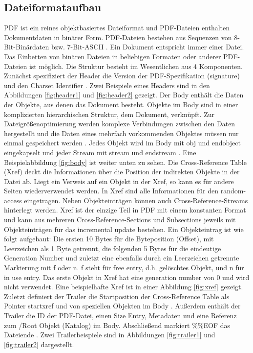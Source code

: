 \subsection{Dateiformataufbau}
PDF ist ein reines objektbasiertes Dateiformat und PDF-Dateien enthalten Dokumentdaten in binärer Form. PDF-Dateien bestehen aus Sequenzen von 8-Bit-Binärdaten bzw. 7-Bit-ASCII \cite{schneeberger}. Ein Dokument entspricht immer einer Datei. Das Einbetten von binären Dateien in beliebigen Formaten oder anderer PDF-Dateien ist möglich. Die Struktur besteht im Wesentlichen aus 4 Komponenten. Zunächst spezifiziert der Header die Version der PDF-Spezifikation (signature) und den Charset Identifier \cite{ccc-pdf-secrets}. Zwei Beispiele eines Headers sind in den Abbildungen \ref{fig:header1} und \ref{fig:header2} gezeigt. Der Body enthält die Daten der Objekte, aus denen das Dokument besteht. Objekte im Body sind in einer komplizierten hierarchischen Struktur, dem Dokument, verknüpft. Zur Dateigrößenoptimierung werden komplexe Verbindungen zwischen den Daten hergestellt und die Daten eines mehrfach vorkommenden Objektes müssen nur einmal gespeichert werden \cite{softx}. Jedes Objekt wird im Body mit obj und endobject eingekapselt und jeder Stream mit stream und endstream \cite{schneeberger}. Eine Beispielabbildung \ref{fig:body} ist weiter unten zu sehen. Die Cross-Reference Table (Xref) deckt die Informationen über die Position der indirekten Objekte in der Datei ab. Liegt ein Verweis auf ein Objekt in der Xref, so kann es für andere Seiten wiederverwendet werden. In Xref sind alle Informationen für den random-access eingetragen. Neben Objekteinträgen können auch Cross-Reference-Streams hinterlegt werden. Xref ist der einzige Teil in PDF mit einem konstanten Format und kann aus mehreren Cross-Reference-Sections und Subsections jeweils mit Objekteinträgen für das incremental update bestehen. Ein Objekteintrag ist wie folgt aufgebaut: Die ersten 10 Bytes für die Byteposition (Offset), mit Leerzeichen als 1 Byte getrennt, die folgenden 5 Bytes für die eindeutige Generation Number und zuletzt eine ebenfalls durch ein Leerzeichen getrennte Markierung mit f oder n. f steht für free entry, d.h. gelöschtes Objekt, und n für in use entry. Das erste Objekt in Xref hat eine generation number von 0 und wird nicht verwendet. Eine beispielhafte Xref ist in einer Abbildung \ref{fig:xref} gezeigt. Zuletzt definiert der Trailer die Startposition der Cross-Reference Table als Pointer startxref und von speziellen Objekten im Body \cite{ccc-break-pdf}.  Außerdem enthält der Trailer die ID der PDF-Datei, einen Size Entry, Metadaten und eine Referenz zum /Root Objekt (Katalog) im Body. Abschließend markiert \%\%EOF das Dateiende \cite{ccc-break-pdf, ccc-pdf-secrets}. Zwei Trailerbeispiele sind in Abbildungen \ref{fig:trailer1} und \ref{fig:trailer2} dargestellt.

